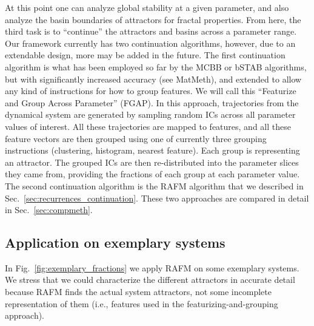 \documentclass[%
 aip,
 amsmath,amssymb,
 reprint,%
]{revtex4-1}
\begin{document}
At this point one can analyze global stability at a given parameter, and also analyze the basin boundaries of attractors for fractal properties. From here, the third task is to ``continue'' the attractors and basins across a parameter range. Our framework currently has two continuation algorithms, however, due to an extendable design, more may be added in the future. The first continuation algorithm is what has been employed so far by the MCBB or bSTAB algorithms, but with significantly increased accuracy (see MatMeth), and extended to allow any kind of instructions for how to group features. We will call this ``Featurize and Group Across Parameter'' (FGAP). In this approach, trajectories from the dynamical system are generated by sampling random ICs across all parameter values of interest. All these trajectories are mapped to features, and all these feature vectors are then grouped using one of currently three grouping instructions (clustering, histogram, nearest feature). Each group is representing an attractor. The grouped ICs are then re-distributed into the parameter slices they came from, providing the fractions of each group at each parameter value. The second continuation algorithm is the RAFM algorithm that we described in Sec.~\ref{sec:recurrences_continuation}. These two approaches are compared in detail in Sec.~\ref{sec:compmeth}.

\subsection{Application on exemplary systems}
\label{sec:applications}
In Fig.~\ref{fig:exemplary_fractions} we apply RAFM on some exemplary systems. We stress that we could characterize the different attractors in accurate detail because RAFM finds the actual system attractors, not some incomplete representation of them (i.e., features used in the featurizing-and-grouping approach).
\end{document}

